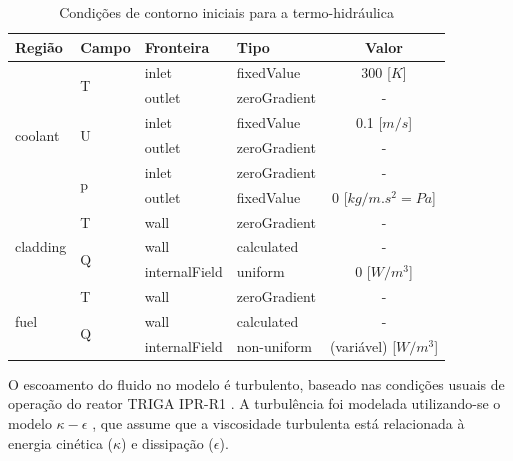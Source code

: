 \begin{table}[htb]
\centering
\caption{Condições de contorno iniciais para a termo-hidráulica}
\label{tab:cc-init}
\begin{tabular}{llllc}
Região                    & Campo                   & Fronteira      & Tipo         & Valor                 \\
\hline
\multirow{6}{*}{coolant}  & \multirow{2}{*}{T}      & inlet         & fixedValue   & 300 [$K$]                  \\
                          &                         & outlet        & zeroGradient & -                     \\
                          & \multirow{2}{*}{U}      & inlet         & fixedValue   & 0.1 {[}$m/s${]}         \\
                          &                         & outlet        & zeroGradient & -                     \\
                          & \multirow{2}{*}{p     } & inlet         & zeroGradient & -                     \\
                          &                         & outlet        & fixedValue   & 0 {[}$kg/m.s^2 = Pa${]}  \\
\hline
\multirow{3}{*}{cladding} & T                       & wall          & zeroGradient & -                     \\
                          & \multirow{2}{*}{Q}      & wall          & calculated   & -                     \\
                          &                         & internalField & uniform      & 0 {[}$W/m^3${]}          \\
\hline
\multirow{3}{*}{fuel}     & T                       & wall          & zeroGradient & -                     \\
                          & \multirow{2}{*}{Q}      & wall          & calculated   & -                     \\
                          &                         & internalField & non-uniform  & (variável) {[}$W/m^3${]}
\end{tabular}
\end{table}

O escoamento do fluido no modelo é turbulento, baseado nas condições usuais de operação
do reator TRIGA IPR-R1 \cite{Veloso2005}. A turbulência foi modelada utilizando-se o modelo
$\kappa-\epsilon$ \cite{Launder1974}, que assume que a viscosidade turbulenta está relacionada
à energia cinética ($\kappa$) e dissipação ($\epsilon$).

